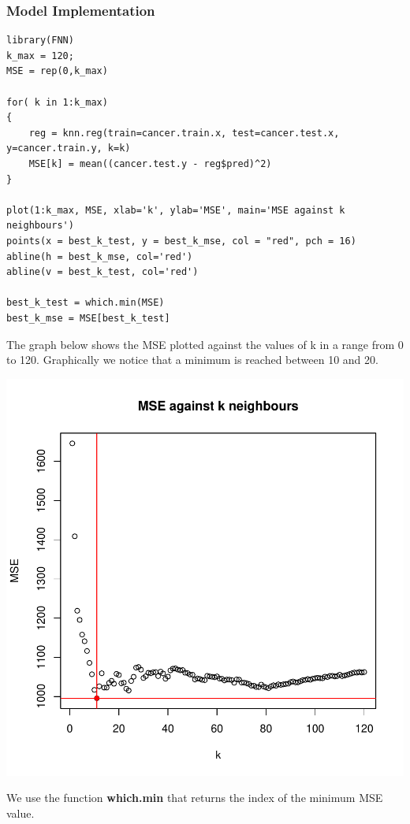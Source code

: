 \documentclass[]{report}
\begin{document}
\subsubsection{Model Implementation}
\begin{lstlisting}
library(FNN)
k_max = 120;
MSE = rep(0,k_max)

for( k in 1:k_max)
{
	reg = knn.reg(train=cancer.train.x, test=cancer.test.x, y=cancer.train.y, k=k)
	MSE[k] = mean((cancer.test.y - reg$pred)^2)
}

plot(1:k_max, MSE, xlab='k', ylab='MSE', main='MSE against k neighbours')
points(x = best_k_test, y = best_k_mse, col = "red", pch = 16)
abline(h = best_k_mse, col='red')
abline(v = best_k_test, col='red')

best_k_test = which.min(MSE)
best_k_mse = MSE[best_k_test]
\end{lstlisting}

The graph below shows the MSE plotted against the values of k in a range from 0 to 120. Graphically we notice that a minimum is reached between 10 and 20.

\begin{center}	
		\includegraphics{Figures/knn_test.pdf}
\end{center}

 We use the function \textbf{which.min} that returns the index of the minimum MSE value.\\
\end{document}
